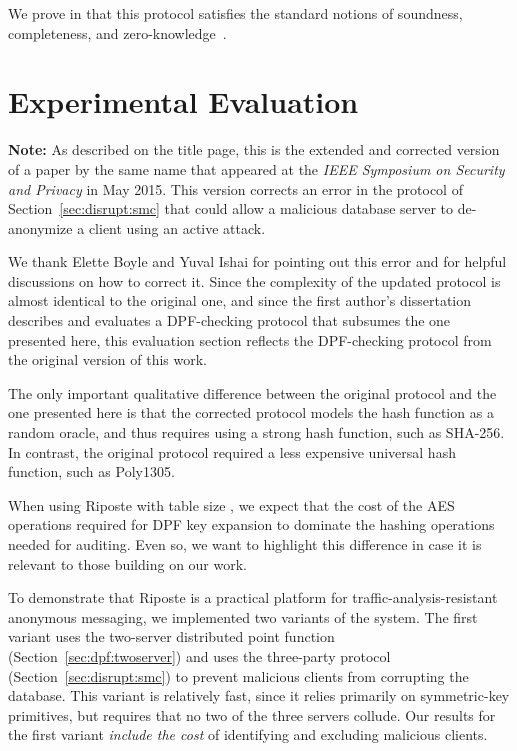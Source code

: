 \documentclass[10pt,twocolumn]{article}
\newcommand{\name}{Riposte\xspace}
\begin{document}
We prove in 
that this protocol satisfies the
standard notions of soundness, completeness, and
zero-knowledge~\cite{camenisch1998group}.

 \section{Experimental Evaluation}
\label{sec:eval}

\begin{framed}
\noindent
{\color{blue} \textbf{Note:}}
As described on the title page, this is the extended and corrected
version of a paper by the same name that appeared at the
{\em IEEE Symposium on Security and Privacy}
in May 2015. This version corrects an error in the 
 protocol of Section~\ref{sec:disrupt:smc}
that could allow a malicious database server to de-anonymize
a client using an active attack.

We thank Elette Boyle and Yuval Ishai for pointing out this
error and for helpful discussions on how to correct it.
Since the complexity of the updated protocol is almost identical
to the original one, and since the first author's 
dissertation~\cite[Section 5]{thesis} describes and evaluates
a DPF-checking protocol that subsumes the one
presented here, this evaluation section 
reflects the DPF-checking protocol from
the original version of this work.

The only important qualitative difference between the original
protocol and the one presented here is that the corrected protocol
models the hash function as a random oracle, and thus requires
using a strong hash function, such as SHA-256.
In contrast, the original protocol required a less expensive 
universal hash function, such as Poly1305.

When using Riposte with table size ,
we expect that the cost of the  AES operations required 
for DPF key expansion to dominate the  hashing
operations needed for auditing.
Even so, we want to highlight this difference in case it
is relevant to those building on our work.
\end{framed}

To demonstrate that \name is a practical platform
for traffic-analysis-resistant anonymous messaging,
we implemented two variants of the system. 
The first variant uses the two-server distributed
point function (Section~\ref{sec:dpf:twoserver})
and uses the three-party protocol 
(Section~\ref{sec:disrupt:smc})
to prevent malicious clients from corrupting the database.
This variant is relatively fast, since it relies
primarily on symmetric-key primitives, but requires
that no two of the three servers collude.
Our results for the first variant {\em include the cost}
of identifying and excluding malicious clients.
\end{document}
